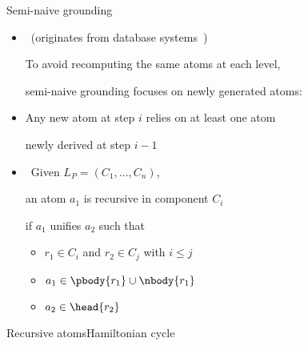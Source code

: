 \begin{frame}{Semi-naive grounding}
  \bigskip
  \begin{itemize}
    \item<1->  \ (originates from database systems~\cite{abhuvi95a})
      \par\smallskip
      To avoid recomputing the same atoms at each level,
      \par
      semi-naive grounding focuses on newly generated atoms:

      \item<1->[] Any new atom at step $i$ relies on at least one atom
      \par
      newly derived at step $i-1$

      \medskip
    \item<2->  \
      Given \(L_P = (C_1, \dots, C_n)\),

      an atom \(a_1\) is \alert{recursive} in component \(C_i\)

      if \(a_1\) unifies \(a_2\) such that

      \smallskip
      \begin{itemize}\normalsize
        \item \(r_1 \in C_i\) and \(r_2 \in C_j\) with \(i \leq j\)
        \item \(a_1 \in \pbody{r_1}\cup\nbody{r_1}\)
        \item \(a_2 \in \head{r_2}\)
      \end{itemize}
  \end{itemize}
\end{frame}
\begin{frame}[shrink]{Recursive atoms}{Hamiltonian cycle}
  \begin{center}
    \DepGraph[\alert]
  \end{center}
\end{frame}
